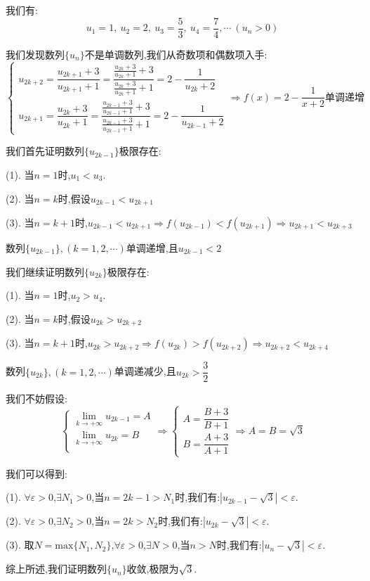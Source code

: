 \begin{solution}

	我们有:
	$$u_{1}=1,\ u_{2}=2,\ u_{3}=\dfrac{5}{3},\ u_{4}=\dfrac{7}{4},\cdots\ (u_{n}>0)$$
	
	我们发现数列$\{u_{n}\}$不是单调数列,我们从奇数项和偶数项入手:
	$$\left\lbrace
	\begin{array}{l}
		u_{2k+2}=\dfrac{u_{2k+1}+3}{u_{2k+1}+1}=\dfrac{\frac{u_{2k}+3}{u_{2k}+1}+3}{\frac{u_{2k}+3}{u_{2k}+1}+1}=2-\dfrac{1}{u_{2k}+2}\\
		u_{2k+1}=\dfrac{u_{2k}+3}{u_{2k}+1}=\dfrac{\frac{u_{2k-1}+3}{u_{2k-1}+1}+3}{\frac{u_{2k-1}+3}{u_{2k-1}+1}+1}=2-\dfrac{1}{u_{2k-1}+2}
	\end{array}
	\right. \Rightarrow f(x)=2-\dfrac{1}{x+2}\text{单调递增}$$
	
	我们首先证明数列$\{u_{2k-1}\}$极限存在:  
	
	(1). 当$n=1$时,$u_{1}<u_{3}$.
	
	(2). 当$n=k$时,假设$u_{2k-1}<u_{2k+1}$
	
	(3). 当$n=k+1$时,$u_{2k-1}<u_{2k+1}\Rightarrow f(u_{2k-1})<f(u_{2k+1})\Rightarrow u_{2k+1}<u_{2k+3}$
	
	数列$\{u_{2k-1}\},(k=1,2,\cdots)$单调递增,且$u_{2k-1}<2$
	
	我们继续证明数列$\{u_{2k}\}$极限存在:  
	
	(1). 当$n=1$时,$u_{2}>u_{4}$.
	
	(2). 当$n=k$时,假设$u_{2k}>u_{2k+2}$
	
	(3). 当$n=k+1$时,$u_{2k}>u_{2k+2}\Rightarrow f(u_{2k})>f(u_{2k+2})\Rightarrow u_{2k+2}<u_{2k+4}$
	
	数列$\{u_{2k}\},(k=1,2,\cdots)$单调递减少,且$u_{2k}>\dfrac{3}{2}$
	
	我们不妨假设:  $$\left\lbrace
	\begin{array}{l}
		\lim\limits_{k\to +\infty}u_{2k-1}=A\\
		\lim\limits_{k\to +\infty}u_{2k}=B\\
	\end{array}
	\right. \Rightarrow \left\lbrace
	\begin{array}{l}
		A=\dfrac{B+3}{B+1}\\
		B=\dfrac{A+3}{A+1}
	\end{array}
	\right. \Rightarrow A=B=\sqrt{3}$$
	
	我们可以得到:  
	
	(1). $\forall \varepsilon>0$,$\exists N_{1}>0$,当$n=2k-1>N_{1}$时,我们有:$|u_{2k-1}-\sqrt{3}|<\varepsilon$.
	
	(2). $\forall \varepsilon>0$,$\exists N_{2}>0$,当$n=2k>N_{2}$时,我们有:$|u_{2k}-\sqrt{3}|<\varepsilon$.
	
	(3). 取$N=\text{max}\{N_{1},N_{2}\}$,$\forall \varepsilon>0$,$\exists N>0$,当$n>N$时,我们有:$|u_{n}-\sqrt{3}|<\varepsilon$.
	
	综上所述,我们证明数列$\{u_{n}\}$收敛,极限为$\sqrt{3}$.
\end{solution}


